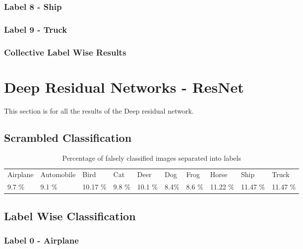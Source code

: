 \subsubsection{Label 8 - Ship}
\FloatBarrier
\subsubsection{Label 9 - Truck}
\FloatBarrier
\subsubsection{Collective Label Wise Results}
\FloatBarrier

\section{Deep Residual Networks - ResNet}
This section is for all the results of the Deep residual network.
\subsection{Scrambled Classification}
\FloatBarrier

\begin{table}[]
	\centering
	\caption{Percentage of falsely classified images separated into labels }
	\label{table:falseclasRes}
	\begin{tabular}{llllllllll}
		Airplane & Automobile & Bird     & Cat    & Deer     & Dog     & Frog   & Horse    & Ship         & Truck         \\
		9.7 \%  & 9.1 \%    & 10.17 \% & 9.8 \% & 10.1 \% & 8.4\% & 8.6 \% & 11.22 \% & 11.47 \% & 11.47 \%
	\end{tabular}
\end{table}
\FloatBarrier
\subsection{Label Wise Classification}
\subsubsection{Label 0 - Airplane}

